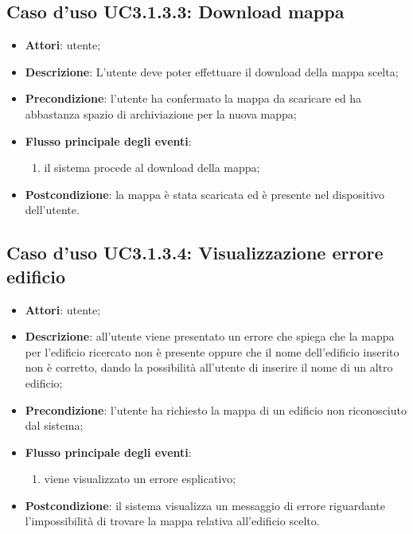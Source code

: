 \documentclass[../AnalisiDeiRequisiti.tex]{subfiles}
\begin{document}
\subsection{Caso d'uso UC3.1.3.3: Download mappa}
\begin{itemize}
\item \textbf{Attori}: utente;
\item \textbf{Descrizione}: L'utente deve poter effettuare il download della mappa scelta; 
      \item \textbf{Precondizione}: l'utente ha confermato la mappa da scaricare ed ha abbastanza spazio di archiviazione per la nuova mappa;

        \item \textbf{Flusso principale degli eventi}:
          \begin{enumerate}
          \item il sistema procede al download della mappa;

      \end{enumerate}
    \item \textbf{Postcondizione}: la mappa è stata scaricata ed è presente nel dispositivo dell'utente.
  \end{itemize}
\hypertarget{UC3.1.3.4}{}
\subsection{Caso d'uso UC3.1.3.4: Visualizzazione errore edificio}
\begin{itemize}
\item \textbf{Attori}: utente;
\item \textbf{Descrizione}: all'utente viene presentato un errore che spiega che la mappa per l'edificio ricercato non è presente oppure che il nome dell'edificio inserito non è corretto, dando la possibilità all'utente di inserire il nome di un altro edificio; 
      \item \textbf{Precondizione}: l'utente ha richiesto la mappa di un edificio non riconosciuto dal sistema;

        \item \textbf{Flusso principale degli eventi}:
          \begin{enumerate}
          \item viene visualizzato un errore esplicativo;

      \end{enumerate}
    \item \textbf{Postcondizione}: il sistema visualizza un messaggio di errore riguardante l'impossibilità di trovare la mappa relativa all'edificio scelto.
  \end{itemize}
\hypertarget{UC3.2}{}
\end{document}
